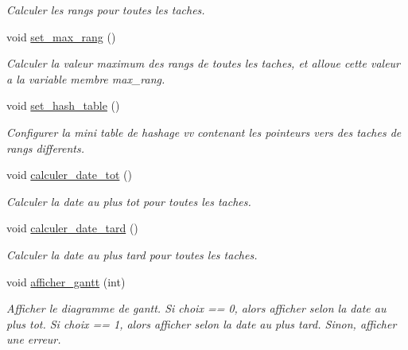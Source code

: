 \begin{DoxyCompactItemize}
\begin{DoxyCompactList}\small\item\em Calculer les rangs pour toutes les taches. \end{DoxyCompactList}\item 
void \hyperlink{structGraphe__ordonnancement_a5a1da43861620550f8ef9e12583d7006}{set\+\_\+max\+\_\+rang} ()
\begin{DoxyCompactList}\small\item\em Calculer la valeur maximum des rangs de toutes les taches, et alloue cette valeur a la variable membre max\+\_\+rang. \end{DoxyCompactList}\item 
void \hyperlink{structGraphe__ordonnancement_aee74c4602cbe1807997f7f6f0636003c}{set\+\_\+hash\+\_\+table} ()
\begin{DoxyCompactList}\small\item\em Configurer la mini table de hashage vv contenant les pointeurs vers des taches de rangs differents. \end{DoxyCompactList}\item 
void \hyperlink{structGraphe__ordonnancement_ad3ed1ec70808bed93577b145da2d8f84}{calculer\+\_\+date\+\_\+tot} ()\hypertarget{structGraphe__ordonnancement_ad3ed1ec70808bed93577b145da2d8f84}{}\label{structGraphe__ordonnancement_ad3ed1ec70808bed93577b145da2d8f84}

\begin{DoxyCompactList}\small\item\em Calculer la date au plus tot pour toutes les taches. \end{DoxyCompactList}\item 
void \hyperlink{structGraphe__ordonnancement_a88bdf78ab25cf63239c2ca969957a8f3}{calculer\+\_\+date\+\_\+tard} ()\hypertarget{structGraphe__ordonnancement_a88bdf78ab25cf63239c2ca969957a8f3}{}\label{structGraphe__ordonnancement_a88bdf78ab25cf63239c2ca969957a8f3}

\begin{DoxyCompactList}\small\item\em Calculer la date au plus tard pour toutes les taches. \end{DoxyCompactList}\item 
void \hyperlink{structGraphe__ordonnancement_a2df58912274a27004b7ee1b309961474}{afficher\+\_\+gantt} (int)
\begin{DoxyCompactList}\small\item\em Afficher le diagramme de gantt. Si choix == 0, alors afficher selon la date au plus tot. Si choix == 1, alors afficher selon la date au plus tard. Sinon, afficher une erreur. \end{DoxyCompactList}\end{DoxyCompactItemize}
